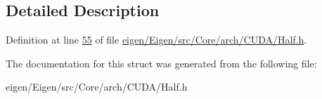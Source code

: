 \subsection{Detailed Description}


Definition at line \hyperlink{eigen_2_eigen_2src_2_core_2arch_2_c_u_d_a_2_half_8h_source_l00055}{55} of file \hyperlink{eigen_2_eigen_2src_2_core_2arch_2_c_u_d_a_2_half_8h_source}{eigen/\+Eigen/src/\+Core/arch/\+C\+U\+D\+A/\+Half.\+h}.



The documentation for this struct was generated from the following file\+:\begin{DoxyCompactItemize}
\item 
eigen/\+Eigen/src/\+Core/arch/\+C\+U\+D\+A/\+Half.\+h\end{DoxyCompactItemize}
